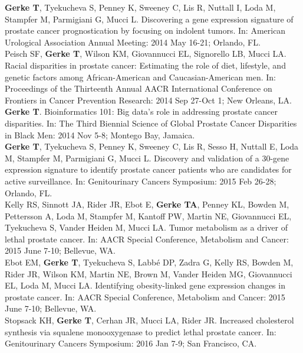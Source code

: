 \documentclass[11pt, a4paper]{article} %
\begin{document}
{\bf Gerke T}, Tyekucheva S, Penney K, Sweeney C, Lis R, Nuttall I, Loda M, Stampfer M, Parmigiani G, Mucci L. Discovering a gene expression signature of prostate cancer prognostication by focusing on indolent tumors. In: American Urological Association Annual Meeting: 2014 May 16-21; Orlando, FL.\\

Peisch SF, {\bf Gerke T}, Wilson KM, Giovannucci EL, Signorello LB, Mucci LA. Racial disparities in prostate cancer: Estimating the role of diet, lifestyle, and genetic factors among African-American and Caucasian-American men. In: Proceedings of the Thirteenth Annual AACR International Conference on Frontiers in Cancer Prevention Research: 2014 Sep 27-Oct 1; New Orleans, LA.\\

{\bf Gerke T}. Bioinformatics 101: Big data's role in addressing prostate cancer disparities. In: The Third Biennial Science of Global Prostate Cancer Disparities in Black Men: 2014 Nov 5-8; Montego Bay, Jamaica.\\

{\bf Gerke T}, Tyekucheva S, Penney K, Sweeney C, Lis R, Sesso H, Nuttall E, Loda M, Stampfer M, Parmigiani G, Mucci L. Discovery and validation of a 30-gene expression signature to identify prostate cancer patients who are candidates for active surveillance. In: Genitourinary Cancers Symposium: 2015 Feb 26-28; Orlando, FL.\\

Kelly RS, Sinnott JA, Rider JR, Ebot E, {\bf Gerke TA}, Penney KL, Bowden M, Pettersson A, Loda M, Stampfer M, Kantoff PW, Martin NE, Giovannucci EL, Tyekucheva S, Vander Heiden M, Mucci LA. Tumor metabolism as a driver of lethal prostate cancer. In: AACR Special Conference, Metabolism and Cancer: 2015 June 7-10; Bellevue, WA.\\

Ebot EM, {\bf Gerke T}, Tyekucheva S, Labb\'{e} DP, Zadra G, Kelly RS, Bowden M, Rider JR, Wilson KM, Martin NE, Brown M, Vander Heiden MG, Giovannucci EL, Loda M, Mucci LA. Identifying obesity-linked gene expression changes in prostate cancer. In: AACR Special Conference, Metabolism and Cancer: 2015 June 7-10; Bellevue, WA.\\

Stopsack KH, {\bf Gerke T}, Cerhan JR, Mucci LA, Rider JR. Increased cholesterol synthesis via squalene monooxygenase to predict lethal prostate cancer. In: Genitourinary Cancers Symposium: 2016 Jan 7-9; San Francisco, CA.\\
\end{document}
